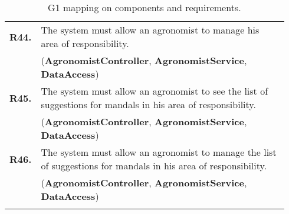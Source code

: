 \begin{longtable}{p{0.06\linewidth} p{0.88\linewidth}}
	\textbf{R44.} & The system must allow an agronomist to manage his area of responsibility.\\
	& (\textbf{AgronomistController}, \textbf{AgronomistService}, \textbf{DataAccess})\\
	\textbf{R45.} & The system must allow an agronomist to see the list of suggestions for mandals in his area of responsibility.\\
	& (\textbf{AgronomistController}, \textbf{AgronomistService}, \textbf{DataAccess})\\
	\textbf{R46.} & The system must allow an agronomist to manage the list of suggestions for mandals in his area of responsibility.\\
	& (\textbf{AgronomistController}, \textbf{AgronomistService}, \textbf{DataAccess})\\
	
    \bottomrule
    \caption{G1 mapping on components and requirements.}
\end{longtable}

